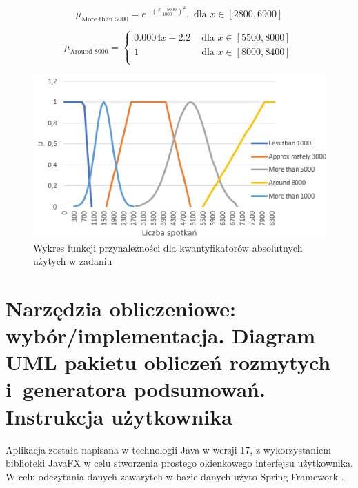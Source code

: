 \documentclass{classrep}
\begin{document}
\begin{equation}
  \mu_{\text{More than 5000}} =e^{-(\frac{x-5000}{1000})^2}, \text{ dla } x \in [2800,6900]
\end{equation}

\begin{equation}
  \mu_{\text{Around 8000}} =
    \begin{cases}
      0.0004x - 2.2 & \text{ dla } x \in [5500,8000] \\
      1 & \text{ dla } x \in [8000,8400] \\
    \end{cases}  
\end{equation}

 \begin{figure}[H]
  \includegraphics{absolute.PNG}
  \caption{Wykres funkcji przynależności dla kwantyfikatorów absolutnych użytych w zadaniu}
\end{figure}



\section{Narzędzia obliczeniowe: wybór/implementacja. Diagram UML pakietu
obliczeń rozmytych i~generatora podsumowań. Instrukcja użytkownika}

Aplikacja została napisana w technologii Java w wersji 17, z wykorzystaniem biblioteki JavaFX \cite{javafx} w celu stworzenia prostego
okienkowego interfejsu użytkownika. W celu odczytania danych zawarytch w bazie danych \cite{database} użyto Spring Framework \cite{spring}. \\
\end{document}
